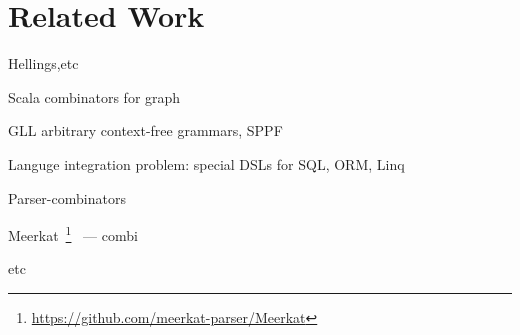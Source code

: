 \section{Related Work}

Hellings,etc

Scala combinators for graph~\cite{ScalaGraphParsing}

GLL arbitrary context-free grammars, SPPF

Languge integration problem: special DSLs for SQL, ORM, Linq

Parser-combinators

Meerkat~\footnote{\url{https://github.com/meerkat-parser/Meerkat}}~\cite{Meerkat} --- combi

etc


